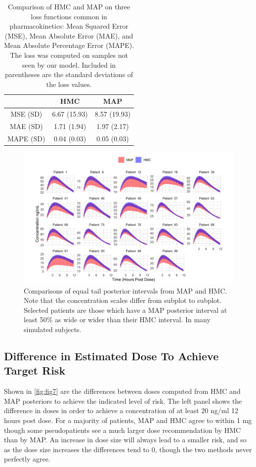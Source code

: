 \begin{table}
	\centering
\begin{tabular}{|c|c|c|}
	\hline 
	& HMC & MAP \\ 
	\hline 
	MSE (SD) & 6.67 (15.93) & 8.57 (19.93) \\ 
	\hline 
	MAE (SD) & 1.71 (1.94) & 1.97 (2.17) \\ 
	\hline 
	MAPE (SD) & 0.04 (0.03) & 0.05 (0.03)\\ 
	\hline 
\end{tabular} 
\caption{Comparison of HMC and MAP on three loss functions common in pharmacokinetics:  Mean Squared Error (MSE), Mean Absolute Error (MAE), and Mean Absolute Percentage Error (MAPE).  The loss was computed on samples not seen by our model.  Included in parentheses are the standard deviations of the loss values.}
\end{table}

\begin{figure}
	\centering
	\includegraphics[width=1\linewidth]{figs/intervals}
	\caption{Comparisons of equal tail posterior intervals from MAP and HMC. Note that the concentration scales differ from subplot to subplot.  Selected patients are those which have a MAP posterior interval at least 50\% as wide or wider than their HMC interval.  In many simulated subjects.}
	\label{fig:fig6}
\end{figure}


\subsection*{Difference in Estimated Dose To Achieve Target Risk}


Shown in \cref{fig:fig7} are the differences between doses computed from HMC and MAP posteriors to achieve the indicated level of risk.  The left panel shows the difference in doses in order to achieve a concentration of at least 20 ng/ml 12 hours post dose. For a majority of patients, MAP and HMC agree to within 1 mg though some pseudopatients see a much larger dose recommendation by HMC than by MAP.  An increase in dose size will always lead to a smaller risk, and so as the dose size increases the differences tend to 0, though the two methods never perfectly agree.

